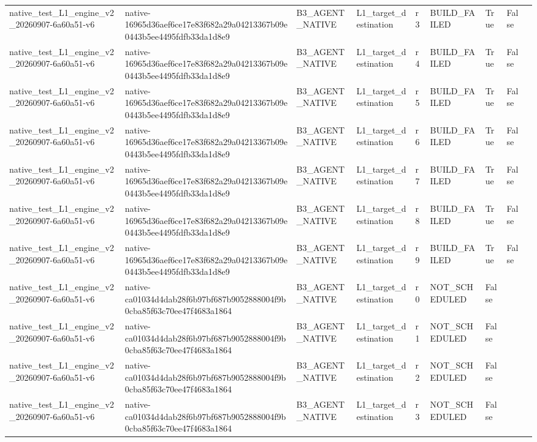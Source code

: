 \begin{tabular}{lllllllll}
native\_test\_L1\_engine\_v2\_20260907-6a60a51-v6 & native-16965d36aef6ce17e83f682a29a04213367b09e0443b5ee4495fdfb33da1d8e9 & B3\_AGENT\_NATIVE & L1\_target\_destination & r3 & BUILD\_FAILED & True & False &  \\
native\_test\_L1\_engine\_v2\_20260907-6a60a51-v6 & native-16965d36aef6ce17e83f682a29a04213367b09e0443b5ee4495fdfb33da1d8e9 & B3\_AGENT\_NATIVE & L1\_target\_destination & r4 & BUILD\_FAILED & True & False &  \\
native\_test\_L1\_engine\_v2\_20260907-6a60a51-v6 & native-16965d36aef6ce17e83f682a29a04213367b09e0443b5ee4495fdfb33da1d8e9 & B3\_AGENT\_NATIVE & L1\_target\_destination & r5 & BUILD\_FAILED & True & False &  \\
native\_test\_L1\_engine\_v2\_20260907-6a60a51-v6 & native-16965d36aef6ce17e83f682a29a04213367b09e0443b5ee4495fdfb33da1d8e9 & B3\_AGENT\_NATIVE & L1\_target\_destination & r6 & BUILD\_FAILED & True & False &  \\
native\_test\_L1\_engine\_v2\_20260907-6a60a51-v6 & native-16965d36aef6ce17e83f682a29a04213367b09e0443b5ee4495fdfb33da1d8e9 & B3\_AGENT\_NATIVE & L1\_target\_destination & r7 & BUILD\_FAILED & True & False &  \\
native\_test\_L1\_engine\_v2\_20260907-6a60a51-v6 & native-16965d36aef6ce17e83f682a29a04213367b09e0443b5ee4495fdfb33da1d8e9 & B3\_AGENT\_NATIVE & L1\_target\_destination & r8 & BUILD\_FAILED & True & False &  \\
native\_test\_L1\_engine\_v2\_20260907-6a60a51-v6 & native-16965d36aef6ce17e83f682a29a04213367b09e0443b5ee4495fdfb33da1d8e9 & B3\_AGENT\_NATIVE & L1\_target\_destination & r9 & BUILD\_FAILED & True & False &  \\
native\_test\_L1\_engine\_v2\_20260907-6a60a51-v6 & native-ca01034d4dab28f6b97bf687b9052888004f9b0cba85f63c70ee47f4683a1864 & B3\_AGENT\_NATIVE & L1\_target\_destination & r0 & NOT\_SCHEDULED & False &  &  \\
native\_test\_L1\_engine\_v2\_20260907-6a60a51-v6 & native-ca01034d4dab28f6b97bf687b9052888004f9b0cba85f63c70ee47f4683a1864 & B3\_AGENT\_NATIVE & L1\_target\_destination & r1 & NOT\_SCHEDULED & False &  &  \\
native\_test\_L1\_engine\_v2\_20260907-6a60a51-v6 & native-ca01034d4dab28f6b97bf687b9052888004f9b0cba85f63c70ee47f4683a1864 & B3\_AGENT\_NATIVE & L1\_target\_destination & r2 & NOT\_SCHEDULED & False &  &  \\
native\_test\_L1\_engine\_v2\_20260907-6a60a51-v6 & native-ca01034d4dab28f6b97bf687b9052888004f9b0cba85f63c70ee47f4683a1864 & B3\_AGENT\_NATIVE & L1\_target\_destination & r3 & NOT\_SCHEDULED & False &  &  \\

\end{tabular}
